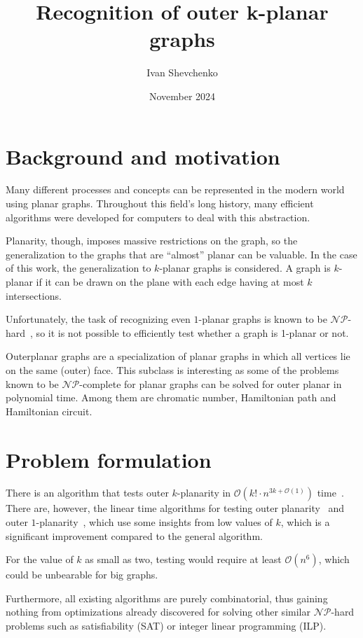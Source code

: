 \documentclass{article}
\title{Recognition of outer k-planar graphs}
\author{Ivan Shevchenko}
\date{November 2024}
\begin{document}
\maketitle

\section{Background and motivation}

Many different processes and concepts can be represented in the modern world using planar graphs. Throughout this field's long history, many efficient algorithms were developed for computers to deal with this abstraction.

Planarity, though, imposes massive restrictions on the graph, so the generalization to the graphs that are ``almost'' planar can be valuable. In the case of this work, the generalization to \(k\)-planar graphs is considered. A graph is \(k\)-planar if it can be drawn on the plane with each edge having at most \(k\) intersections. 

Unfortunately, the task of recognizing even \(1\)-planar graphs is known to be \(\mathcal{NP}\)-hard~\cite{NP-hard-1p}, so it is not possible to efficiently test whether a graph is 1-planar or not.

Outerplanar graphs are a specialization of planar graphs in which all vertices lie on the same (outer) face. This subclass is interesting as some of the problems known to be \(\mathcal{NP}\)-complete for planar graphs can be solved for outer planar in polynomial time. Among them are chromatic number, Hamiltonian path and Hamiltonian circuit.

\section{Problem formulation}

There is an algorithm that tests outer \(k\)-planarity in \(\mathcal{O}(k!\cdot n^{3k+\mathcal{O}(1)})\) time~\cite{okp}. There are, however, the linear time algorithms for testing outer planarity~\cite{linear-op} and outer \(1\)-planarity~\cite{linear-o1p, linear-o1p_}, which use some insights from low values of \(k\), which is a significant improvement compared to the general algorithm.

For the value of \(k\) as small as two, testing would require at least \(\mathcal{O}(n^6)\), which could be unbearable for big graphs. 

Furthermore, all existing algorithms are purely combinatorial, thus gaining nothing from optimizations already discovered for solving other similar \(\mathcal{NP}\)-hard problems such as satisfiability (SAT) or integer linear programming (ILP).
\end{document}
